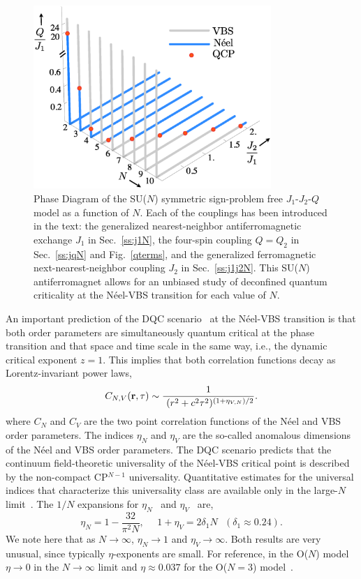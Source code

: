 \documentclass[10pt,pre,aps,twocolumn,showpacs,superscriptaddress,floatfix]{revtex4-1}
\begin{document}
\begin{figure}
\includegraphics[width=9cm, clip]{fig06.eps}
  \caption{ \label{fig:pdj1j2q} Phase Diagram of the SU($N$) symmetric sign-problem free
    $J_1$-$J_2$-$Q$ model as a function of $N$. Each of the couplings has been introduced
    in the text: the generalized nearest-neighbor antiferromagnetic exchange $J_1$ in Sec.~\ref{ss:j1N}, the four-spin coupling $Q=Q_2$ in 
    Sec.~\ref{ss:jqN} and Fig.~\ref{qterms}, and the generalized ferromagnetic next-nearest-neighbor coupling $J_2$ in Sec.~\ref{ss:j1j2N}. 
    This SU($N$) antiferromagnet allows for an unbiased study of deconfined quantum
    criticality at the N\'eel-VBS transition for each value of $N$. }
\end{figure}

An important prediction of the DQC scenario~\cite{Senthil04a} at the N\'eel-VBS transition is that both order parameters are
simultaneously quantum critical at the phase transition and that space and time scale in the same way, i.e., the dynamic critical 
exponent $z=1$. This implies that both correlation functions decay as Lorentz-invariant power laws,
\begin{equation}
\label{eq:expdef}
C_{N,V} ({\bf r},\tau) \sim  \frac{1}{~(r^2+c^2\tau^2)^{(1+\eta_{V,N})/2}}.
\end{equation}
 where $C_N$ and $C_V$ are the two point correlation functions of the
 N\'eel and VBS order parameters. The indices $\eta_N$ and $\eta_V$
 are the so-called anomalous dimensions of the N\'eel and VBS order
 parameters. The DQC scenario predicts that
 the continuum field-theoretic universality of the N\'eel-VBS critical
 point is described by the non-compact CP$^{N-1}$ universality. Quantitative
 estimates for the universal indices that characterize this
 universality class are available only in the large-$N$
 limit~\cite{halperin1974:largeN}. The ${1}/{N}$ expansions for $\eta_N$~\cite{kaul2008:u1} and $\eta_V$~\cite{murthy1990:mono,metlitski2008:mono} are,
\begin{equation}
\label{eq:oneonN}
\eta_N = 1 - \frac{32}{\pi^2N},~~~~~~
1+\eta_V = 2 \delta_1 N~~~(\delta_1\approx 0.24).
\end{equation}
We note here that as $N\rightarrow\infty$, $\eta_N \rightarrow 1$ and $\eta_V\rightarrow \infty$. Both results are very unusual, since typically 
$\eta$-exponents are small. For reference, in the O($N$) model $\eta\rightarrow0$ in the $N\rightarrow\infty$ limit and $\eta \approx 0.037$ 
for the O($N=3$) model~\cite{campostrini2002:o3}.
\end{document}
